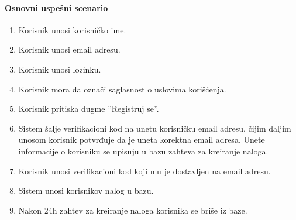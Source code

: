 \documentclass[a4paper,12pt]{report}
\begin{document}
    \paragraph*{Osnovni uspešni scenario}
    \begin{enumerate}
        \item Korisnik unosi korisničko ime.
        \item Korisnik unosi email adresu.
        \item Korisnik unosi lozinku.
        \item Korisnik mora da označi saglasnost o uslovima korišćenja.
        \item Korisnik pritiska dugme ''Registruj se''.
        \item Sistem šalje verifikacioni kod na unetu korisničku email adresu, čijim daljim unosom korisnik potvrđuje da je uneta korektna email adresa. Unete informacije o korisniku se upisuju u bazu zahteva za kreiranje naloga. 
        \item Korisnik unosi verifikacioni kod koji mu je dostavljen na email adresu.
        \item Sistem unosi korisnikov nalog u bazu.
        \item Nakon 24h zahtev za kreiranje naloga korisnika se briše iz baze.
    \end{enumerate}
\end{document}
